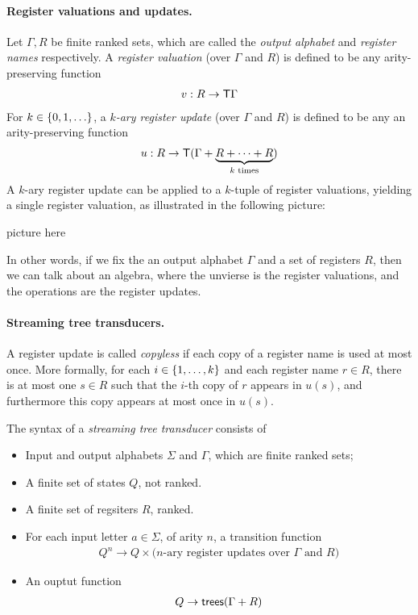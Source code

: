 \paragraph*{Register valuations and updates.}   Let $\Gamma, R$ be finite ranked sets, which are called the \emph{output alphabet} and \emph{register names} respectively.  
A \emph{register valuation} (over $\Gamma$ and $R$) is defined to be any arity-preserving function
\begin{align*}
    v : R \to \mathsf T \Gamma
\end{align*}
For  $k \in \{0,1,\ldots\}$, a \emph{$k$-ary register update} (over $\Gamma$ and $R$) is defined to be any an arity-preserving function
\begin{align*}
    u : R \to \mathsf T ( \Gamma + \underbrace{R + \cdots +R}_{\text{$k$ times}})
\end{align*}
A $k$-ary register update can be applied to a $k$-tuple of register valuations, yielding a single register valuation, as illustrated in the following picture:
\begin{center}
    picture here
\end{center}
In other words, if we fix the an output alphabet $\Gamma$ and a set of registers $R$, then we can talk about an algebra, where the unvierse is the register valuations, and the operations are the register updates.

\paragraph*{Streaming tree transducers.} A register update is called \emph{copyless} if each copy of a register name is used at most once. More formally, for each $i \in \{1,\ldots,k\}$ and each register name $r \in R$, there is at most one $s \in R$ such that the $i$-th copy of $r$ appears in $u(s)$, and furthermore this copy appears at most once in $u(s)$. 


\begin{definition}\label{def:stt}
    The syntax of a  \emph{streaming tree transducer} consists of 
\begin{itemize}
    \item Input and output alphabets $\Sigma$ and $\Gamma$, which are finite ranked sets;
    \item A finite set of states $Q$, not ranked.
    \item A finite set of regsiters $R$, ranked.
    \item For each input letter $a \in \Sigma$, of arity $n$, a transition function
 \begin{align*}
     Q^n \to Q \times \text{($n$-ary register updates over $\Gamma$ and $R$)}
 \end{align*}
 \item An ouptut function
 \begin{align*}
     Q \to \mathsf {trees}(\Gamma + R)
 \end{align*}
\end{itemize}
\end{definition}

